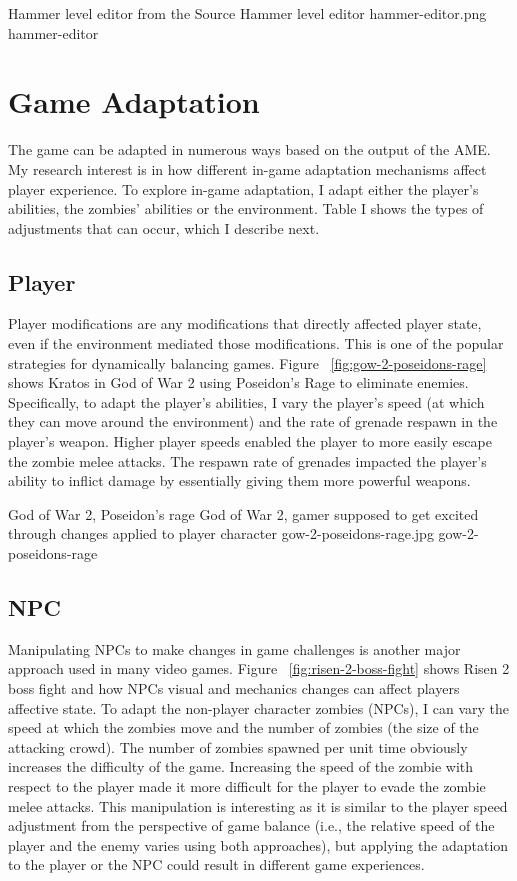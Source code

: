 \largeimg
{Hammer level editor from the Source}
{Hammer level editor}
{hammer-editor.png}
{hammer-editor}

\section{Game Adaptation}
The game can be adapted in numerous ways based on the output of the AME. My research interest is in how different in-game adaptation mechanisms affect player experience. To explore in-game adaptation, I adapt either the player's abilities, the zombies' abilities or the environment. Table I shows the types of adjustments that can occur, which I describe next.

\subsection{Player}
Player modifications are any modifications that directly affected player state, even if the environment mediated those modifications. This is one of the popular strategies for dynamically balancing games. Figure ~\ref{fig:gow-2-poseidons-rage} shows Kratos in God of War 2 using Poseidon's Rage to eliminate enemies. Specifically, to adapt the player's abilities, I vary the player's speed (at which they can move around the environment) and the rate of grenade respawn in the player's weapon. Higher player speeds enabled the player to more easily escape the zombie melee attacks. The respawn rate of grenades impacted the player's ability to inflict damage by essentially giving them more powerful weapons.

\largeimg
{God of War 2, Poseidon's rage}
{God of War 2, gamer supposed to get excited through changes applied to player character}
{gow-2-poseidons-rage.jpg}
{gow-2-poseidons-rage}

\subsection{NPC}
Manipulating NPCs to make changes in game challenges is another major approach used in many video games. Figure ~\ref{fig:risen-2-boss-fight} shows Risen 2 boss fight and how NPCs visual and mechanics changes can affect players affective state. To adapt the non-player character zombies (NPCs), I can vary the speed at which the zombies move and the number of zombies (the size of the attacking crowd). The number of zombies spawned per unit time obviously increases the difficulty of the game. Increasing the speed of the zombie with respect to the player made it more difficult for the player to evade the zombie melee attacks. This manipulation is interesting as it is similar to the player speed adjustment from the perspective of game balance (i.e., the relative speed of the player and the enemy varies using both approaches), but applying the adaptation to the player or the NPC could result in different game experiences.

